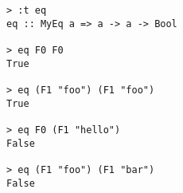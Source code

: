 \begin{repl}\begin{lstlisting}
> :t eq
eq :: MyEq a => a -> a -> Bool

> eq F0 F0
True

> eq (F1 "foo") (F1 "foo")
True

> eq F0 (F1 "hello")
False

> eq (F1 "foo") (F1 "bar")
False\end{lstlisting}\end{repl}
